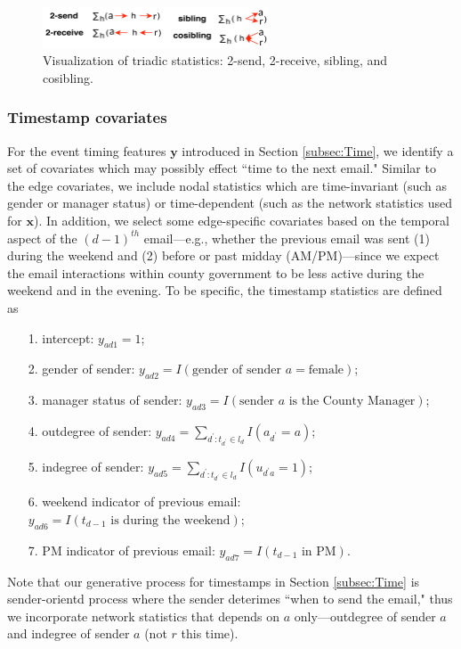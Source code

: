 \documentclass[ba]{imsart}
\numberwithin{equation}{section}
\theoremstyle{plain}
\begin{document}
 	   \begin{figure}[!t]
 	   	\centering
 	   	\includegraphics[width=0.6\textwidth]{img/triad-1.png}	
 	   	\caption {Visualization of triadic statistics: 2-send, 2-receive, sibling, and cosibling.}
 	   	\label{figure:netstats}
 	   \end{figure}
 	   
 	    	   \subsubsection{Timestamp covariates}
 	   For the event timing features $\boldsymbol{y}$ introduced in Section \ref{subsec:Time}, we identify a set of covariates which may possibly effect ``time to the next email." Similar to the edge covariates, we include nodal statistics which are time-invariant (such as gender or manager status) or time-dependent (such as the network statistics used for $\boldsymbol{x}$). In addition, we select some edge-specific covariates based on the temporal aspect of the $(d-1)^{th}$ email---e.g., whether the previous email was sent (1) during the weekend and (2) before or past midday (AM/PM)---since we expect the email interactions within county government to be less active during the weekend and in the evening. To be specific, the timestamp statistics are defined as
 	   \begin{itemize}
 	   	\item[1.] intercept: ${y}_{ad1} =1$;
 	   \item[2.] gender of sender: ${y}_{ad2}=I(\mbox{gender of sender }a= \mbox{female})$;
 	   \item[3.] manager status of sender: ${y}_{ad3}=I(\mbox{sender }a \mbox{ is the County Manager})$;
 	   	\item[4.] outdegree of sender: ${y}_{ad4} =\sum_{d^\prime: t_{d^\prime} \in l_d} I(a_{d^\prime} = a)$;
 	   	\item[5.] indegree of sender: ${y}_{ad5}=\sum_{d^\prime: t_{d^\prime} \in l_d} I(u_{d^\prime a} = 1)$;
 	   	\item[6.] weekend indicator of previous email: ${y}_{ad6} = I(t_{d-1} \mbox{ is during the } \mbox{weekend})$;
 	   	\item[7.] PM indicator of previous email: ${y}_{ad7}= I(t_{d-1} \mbox{ in } \mbox{PM})$.
 	   \end{itemize}
 	   Note that our generative process for timestamps in Section \ref{subsec:Time} is sender-orientd process where the sender deterimes ``when to send the email," thus we incorporate network statistics that depends on $a$ only---outdegree of sender $a$ and indegree of sender $a$ (not $r$ this time).
\end{document}
